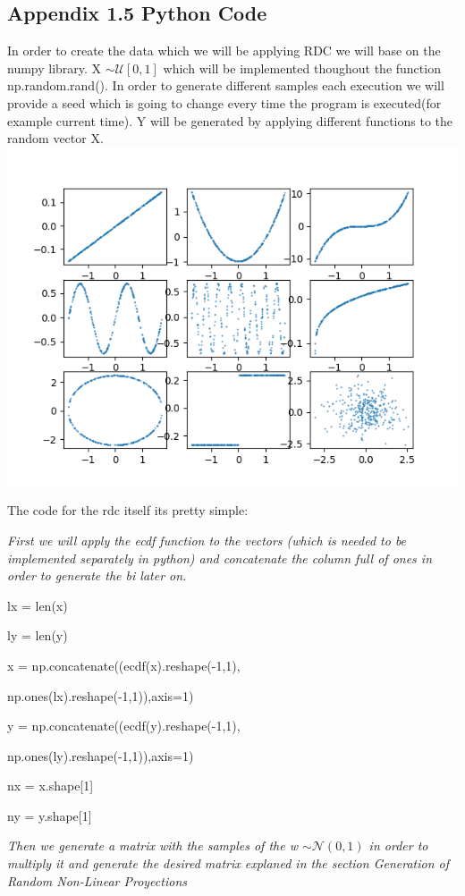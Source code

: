 \documentclass[11pt,twoside,a4paper]{article}
\begin{document}
\begin{flushleft}
\subsection*{Appendix 1.5 Python Code}
In order to create the data which we will be applying RDC we will base on the numpy library.
X $\sim \mathcal{U}[0,1]$ which will be implemented thoughout the function np.random.rand(). In order to generate different samples each execution we will provide a seed which is going to change every time the program is executed(for example current time).
Y will be generated by applying different functions to the random vector X.
\includegraphics{Figure_1}

The code for the rdc itself its pretty simple:

\textit{First we will apply the ecdf function to the vectors (which is needed to be implemented separately in python) and concatenate the column full of ones in order to generate the bi later on.}	

	lx = len(x)

	ly = len(y)

	x = np.concatenate((ecdf(x).reshape(-1,1),

		np.ones(lx).reshape(-1,1)),axis=1)

	y = np.concatenate((ecdf(y).reshape(-1,1),

		np.ones(ly).reshape(-1,1)),axis=1)	

	nx = x.shape[1]

	ny = y.shape[1]
	
\textit{Then we generate a matrix with the samples of the w $\sim \mathcal{N}(0,1)$ in order to multiply it and generate the desired matrix explaned in the section Generation of Random Non-Linear Proyections}


\end{flushleft}
\end{document}
